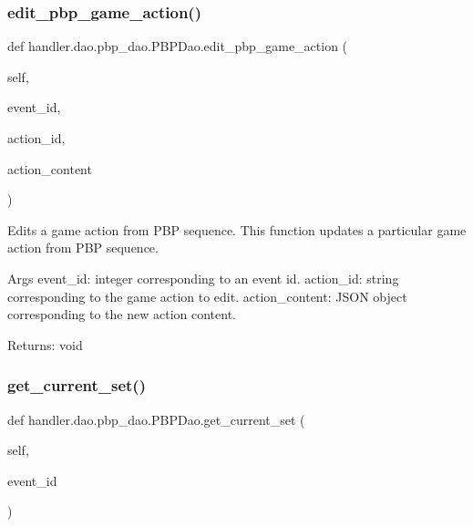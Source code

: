 \subsubsection{\texorpdfstring{edit\+\_\+pbp\+\_\+game\+\_\+action()}{edit\_pbp\_game\_action()}}
{\footnotesize\ttfamily def handler.\+dao.\+pbp\+\_\+dao.\+P\+B\+P\+Dao.\+edit\+\_\+pbp\+\_\+game\+\_\+action (\begin{DoxyParamCaption}\item[{}]{self,  }\item[{}]{event\+\_\+id,  }\item[{}]{action\+\_\+id,  }\item[{}]{action\+\_\+content }\end{DoxyParamCaption})}

\begin{DoxyVerb}Edits a game action from PBP sequence.
This function updates a particular game action from PBP sequence.

Args
    event_id: integer corresponding to an event id.
    action_id: string corresponding to the game action to edit.
    action_content: JSON object corresponding to the new action content.

Returns:
    void
\end{DoxyVerb}
 \mbox{\label{classhandler_1_1dao_1_1pbp__dao_1_1_p_b_p_dao_a984f75760da8e0d09012da4d0c7d0773}} 
\subsubsection{\texorpdfstring{get\+\_\+current\+\_\+set()}{get\_current\_set()}}
{\footnotesize\ttfamily def handler.\+dao.\+pbp\+\_\+dao.\+P\+B\+P\+Dao.\+get\+\_\+current\+\_\+set (\begin{DoxyParamCaption}\item[{}]{self,  }\item[{}]{event\+\_\+id }\end{DoxyParamCaption})}

